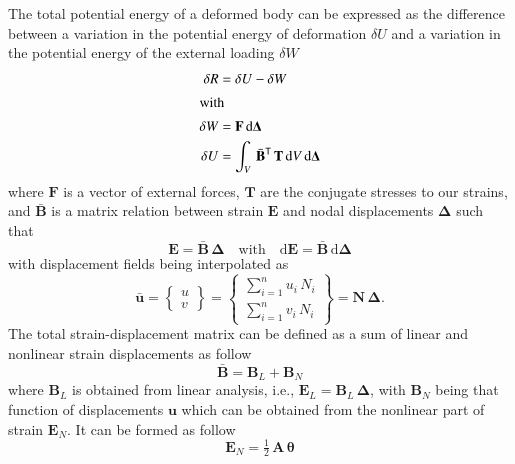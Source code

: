 The total potential energy of a deformed body can be expressed as the difference between a variation in the potential energy of deformation $\delta{U}$ and a variation in the potential energy of the external loading $\delta{W}$ \cite{Yangetal10}
\begin{subequations}
    \label{principle}
\begin{align}
\delta{R} &= \delta{U} - \delta{W}\\
\intertext{with}
\delta{W} & = \mathbf{F} \, \mathrm{d} \boldsymbol{\Delta}\\
\delta{U} & = \int_{V} \, \bar{\mathbf{B}}^{\mathsf{T}} \, \mathbf{T} \, \mathrm{d} V \, \mathrm{d} \boldsymbol{\Delta}
\end{align}
\end{subequations}
where $\mathbf{F}$ is a vector of external forces, $\mathbf{T}$ are the conjugate stresses to our strains, and $\bar{\mathbf{B}}$ is a matrix relation between strain $\mathbf{E}$ and nodal displacements $\boldsymbol{\Delta}$ such that
\begin{equation}
\mathbf{E} = \bar{\mathbf{B}} \,  \boldsymbol{\Delta} \quad \text{with} \quad \mathrm{d} \mathbf{E} = \bar{\mathbf{B}} \, \mathrm{d} \boldsymbol{\Delta}
\label{strain} 
\end{equation}
with displacement fields being interpolated as
\begin{equation}
\bar{\mathbf{ u}} = 
\begin{Bmatrix}
u \\
v     
\end{Bmatrix}
=
\begin{Bmatrix}
\sum_{i=1}^{n} u_i \, N_i \\
\sum_{i=1}^{n} v_i \, N_i     
\end{Bmatrix}
= \mathbf{N} \, \boldsymbol{\Delta} .
\end{equation} 
The total strain-displacement matrix can be defined as a sum of linear and nonlinear strain displacements as follow
\begin{equation}
\bar{\mathbf{B}} = \mathbf{B}_L + \mathbf{B}_N
\label{straindis}
\end{equation} 
where $\mathbf{B}_L$ is obtained from linear analysis, i.e., $\mathbf{E}_L = \mathbf{B}_L \, \boldsymbol{\Delta}$, with $\mathbf{B}_N$ being that function of displacements $ \mathbf{u}$ which can be obtained from the nonlinear part of strain $\mathbf{E}_N$.  It can be formed as follow 
\begin{equation}
\mathbf{E}_N = \tfrac{1}{2} \, {\mathbf{A}} \,  \boldsymbol{\theta}
\end{equation}
